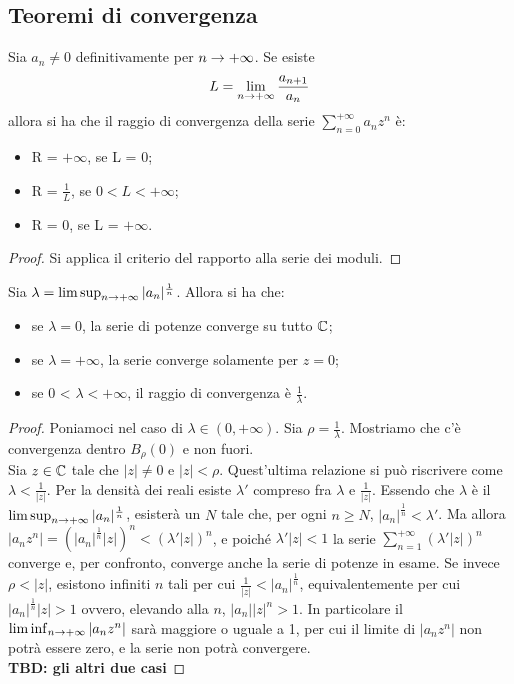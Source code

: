 \documentclass[Completo.tex]{subfiles}
\begin{document}
\subsection{Teoremi di convergenza}
\begin{Th}[d'Alembert]
	Sia $a_n \neq 0$ definitivamente per $n \rightarrow +\infty$. Se esiste
	\begin{equation*}
	L = \lim\limits_{n \rightarrow +\infty} \frac{a_{n+1}}{a_n}
	\end{equation*}
	allora si ha che il raggio di convergenza della serie $\sum\limits_{n=0}^{+\infty} a_n z^n$ è:
	\begin{itemize}
		\item R = $+\infty$, se L = 0;
		\item R = $\frac{1}{L}$, se $0 < L < +\infty$;
		\item R = 0, se L = $+\infty$.
	\end{itemize}
\end{Th}
\begin{proof}
	Si applica il criterio del rapporto alla serie dei moduli.
\end{proof}
\begin{eTh}
	Sia $\lambda = \limsup_{n \rightarrow +\infty} \vert a_n \vert^{\frac{1}{n}}$. Allora si ha che:
	\begin{itemize}
		\item se $\lambda = 0$, la serie di potenze converge su tutto $\bb[C]$;
		\item se $\lambda = +\infty$, la serie converge solamente per $z = 0$;
		\item se 0 < $\lambda < +\infty$, il raggio di convergenza è $\frac{1}{\lambda}$.
		\end{itemize}
\end{eTh}
\begin{proof}
	Poniamoci nel caso di $\lambda \in (0, +\infty)$. Sia $\rho = \frac{1}{\lambda}$. Mostriamo che c'è convergenza dentro $B_{\rho}(0)$ e non fuori. \\
	Sia $z \in \bb[C]$ tale che $\vert z \vert \neq 0$ e $\vert z \vert < \rho$. Quest'ultima relazione si può riscrivere come $\lambda < \frac{1}{\vert z \vert}$. Per la densità dei reali esiste $\lambda'$ compreso fra $\lambda$ e $\frac{1}{\vert z \vert}$. Essendo che $\lambda$ è il $\limsup_{n \rightarrow +\infty} \vert a_n \vert^{\frac{1}{n}}$, esisterà un $N$ tale che, per ogni $n \geq N$, $\vert a_n \vert^{\frac{1}{n}} < \lambda'$. Ma allora $\vert a_n z^n \vert = (\vert a_n \vert^{\frac{1}{n}} \vert z \vert)^n < (\lambda' \vert z \vert)^n$, e poiché $\lambda' \vert z \vert < 1$ la serie $\sum_{n = 1}^{+\infty} (\lambda' \vert z \vert)^n$ converge e, per confronto, converge anche la serie di potenze in esame. Se invece $\rho < \vert z \vert$, esistono infiniti $n$ tali per cui $\frac{1}{\vert z \vert} < \vert a_n \vert^{\frac{1}{n}}$, equivalentemente per cui $\vert a_n \vert^{\frac{1}{n}} \vert z \vert > 1$ ovvero, elevando alla $n$, $\vert a_n \vert \vert z \vert^n > 1$. In particolare il $\liminf_{n \rightarrow +\infty} \vert a_n z^n \vert$ sarà maggiore o uguale a 1, per cui il limite di $\vert a_n z^n \vert$ non potrà essere zero, e la serie non potrà convergere. \\
	\textbf{TBD: gli altri due casi}
\end{proof}
\end{document}
